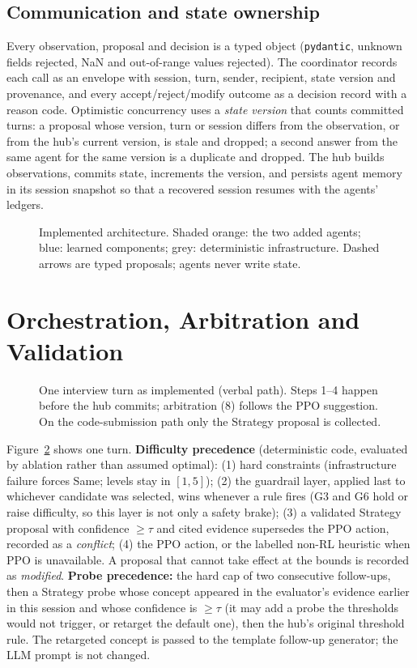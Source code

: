 \subsection{Communication and state ownership}\label{sec:comm}
Every observation, proposal and decision is a typed object (\texttt{pydantic}, unknown fields rejected, NaN and out-of-range values rejected). The coordinator records each call as an envelope with session, turn, sender, recipient, state version and provenance, and every accept/reject/modify outcome as a decision record with a reason code. Optimistic concurrency uses a \emph{state version} that counts committed turns: a proposal whose version, turn or session differs from the observation, or from the hub's current version, is stale and dropped; a second answer from the same agent for the same version is a duplicate and dropped. The hub builds observations, commits state, increments the version, and persists agent memory in its session snapshot so that a recovered session resumes with the agents' ledgers.

\begin{figure}[tbp]
\centering
\resizebox{\textwidth}{!}{}
\caption{Implemented architecture. Shaded orange: the two added agents; blue: learned components; grey: deterministic infrastructure. Dashed arrows are typed proposals; agents never write state.}\label{fig:arch}
\end{figure}

\section{Orchestration, Arbitration and Validation}\label{sec:arbitration}
\begin{figure}[tbp]
\centering
\resizebox{0.97\textwidth}{!}{}
\caption{One interview turn as implemented (verbal path). Steps 1--4 happen before the hub commits; arbitration (8) follows the PPO suggestion. On the code-submission path only the Strategy proposal is collected.}\label{fig:flow}
\end{figure}
Figure~\ref{fig:flow} shows one turn. \textbf{Difficulty precedence} (deterministic code, evaluated by ablation rather than assumed optimal): (1) hard constraints (infrastructure failure forces Same; levels stay in $[1,5]$); (2) the guardrail layer, applied last to whichever candidate was selected, wins whenever a rule fires (G3 and G6 hold or raise difficulty, so this layer is not only a safety brake); (3) a validated Strategy proposal with confidence $\ge\tau$ and cited evidence supersedes the PPO action, recorded as a \emph{conflict}; (4) the PPO action, or the labelled non-RL heuristic when PPO is unavailable. A proposal that cannot take effect at the bounds is recorded as \emph{modified}. \textbf{Probe precedence:} the hard cap of two consecutive follow-ups, then a Strategy probe whose concept appeared in the evaluator's evidence earlier in this session and whose confidence is $\ge\tau$ (it may add a probe the thresholds would not trigger, or retarget the default one), then the hub's original threshold rule. The retargeted concept is passed to the template follow-up generator; the LLM prompt is not changed.

